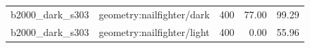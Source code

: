 \begin{longtable}{l>{\raggedright\arraybackslash}p{.42\linewidth}rrr}
b2000\_\allowbreak{}dark\_\allowbreak{}s303 & %
geometry:nailfighter/dark & %
400 & %
77.00 & %
99.29 \\ %

b2000\_\allowbreak{}dark\_\allowbreak{}s303 & %
geometry:nailfighter/light & %
400 & %
0.00 & %
55.96 \\ %


\end{longtable}

